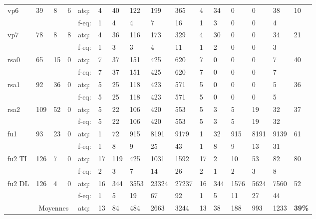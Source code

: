 \begin{table}[p]
\begin{center}
\begin{tabular}{llll|llllll|lllll|l}
                        \hline
                        vp6 & 39 & 8 & 6 & atq: & 4 & 40 & 122 & 199 & 365 & 4 & 34 & 0 & 0 & 38 & 10 \\
                         &  &  &  & f-eq: & 1 & 4 & 4 & 7 & 16 & 1 & 3 & 0 & 0 & 4 &  \\
                        \hline
                        vp7 & 78 & 8 & 8 & atq: & 4 & 36 & 116 & 173 & 329 & 4 & 30 & 0 & 0 & 34 & 21 \\
                         &  &  &  & f-eq: & 1 & 3 & 3 & 4 & 11 & 1 & 2 & 0 & 0 & 3 &  \\
                        \hline
                        rsa0 & 65 & 15 & 0 & atq: & 7 & 37 & 151 & 425 & 620 & 7 & 0 & 0 & 0 & 7 & 40 \\
                         &  &  &  & f-eq: & 7 & 37 & 151 & 425 & 620 & 7 & 0 & 0 & 0 & 7 &  \\
                        \hline
                        rsa1 & 92 & 36 & 0 & atq: & 5 & 25 & 118 & 423 & 571 & 5 & 0 & 0 & 0 & 5 & 36 \\
                         &  &  &  & f-eq: & 5 & 25 & 118 & 423 & 571 & 5 & 0 & 0 & 0 & 5 &  \\
                        \hline
                        rsa2 & 109 & 52 & 0 & atq: & 5 & 22 & 106 & 420 & 553 & 5 & 3 & 5 & 19 & 32 & 37 \\
                         &  &  &  & f-eq: & 5 & 22 & 106 & 420 & 553 & 5 & 3 & 5 & 19 & 32 &  \\
                        \hline
                        fu1 & 93 & 23 & 0 & atq: & 1 & 72 & 915 & 8191 & 9179 & 1 & 32 & 915 & 8191 & 9139 & 61 \\
                         &  &  &  & f-eq: & 1 & 8 & 9 & 25 & 43 & 1 & 8 & 9 & 13 & 31 &  \\
                        \hline
                        fu2 TI & 126 & 7 & 0 & atq: & 17 & 119 & 425 & 1031 & 1592 & 17 & 2 & 10 & 53 & 82 & 80 \\
                         &  &  &  & f-eq: & 2 & 3 & 7 & 14 & 26 & 2 & 1 & 2 & 3 & 8 &  \\
                        \hline
                        fu2 DL & 126 & 4 & 0 & atq: & 16 & 344 & 3553 & 23324 & 27237 & 16 & 344 & 1576 & 5624 & 7560 & 52 \\
                         &  &  &  & f-eq: & 1 & 5 & 19 & 67 & 92 & 1 & 5 & 11 & 27 & 44 &  \\
                        \hline
                        \hline
                         & \multicolumn{3}{c|}{\multirow{2}{*}{Moyennes}} & atq: & 13 & 84 & 484 & 2663 & 3244 & 13 & 38 & 188 & 993 & 1233 & \multicolumn{1}{r}{\textbf{39\%}} \\

\end{tabular}
\end{center}
\end{table}
